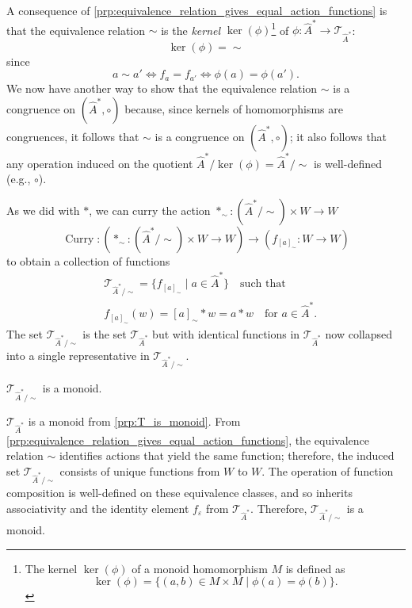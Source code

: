 A consequence of \cref{prp:equivalence_relation_gives_equal_action_functions} is that the equivalence relation $\sim$ is the \emph{kernel} $\operatorname{ker}(\phi)$\footnote{
The kernel $\operatorname{ker}(\phi)$ of a monoid homomorphism $M$ is defined as
\begin{equation}
    \operatorname{ker}(\phi) = \{(a,b) \in M \times M \mid \phi(a) = \phi(b) \}.
\end{equation}
} of $\phi: \hat{A}^{*} \to \mathcal{T}_{\hat{A}^{*}}$:
\begin{equation}
    \operatorname{ker}(\phi) = \sim
\end{equation}
since
\begin{equation}
    a \sim a' \iff f_{a} = f_{a'} \iff \phi(a) = \phi(a').
\end{equation}
We now have another way to show that the equivalence relation $\sim$ is a congruence on $(\hat{A}^{*}, \circ)$ because, since kernels of homomorphisms are congruences, it follows that $\sim$ is a congruence on $(\hat{A}^{*}, \circ)$; it also follows that any operation induced on the quotient $\hat{A}^{*}/\operatorname{ker}(\phi) = \hat{A}^{*}/\sim$ is well-defined (e.g., $\circ$).

As we did with $\ast$, we can curry the action $\ast_{\sim}: (\hat{A}^{*}/\sim) \times W \to W$
\begin{equation}
    \operatorname{Curry}: (\ast_{\sim}: (\hat{A}^{*}/\sim) \times W \to W) \to (f_{[a]_{\sim}}: W \to W)
\end{equation}
to obtain a collection of functions
\begin{equation}
\begin{aligned}
     & \mathcal{T}_{\hat{A}^{*}/\sim} = \{ f_{[a]_{\sim}} \mid a \in \hat{A}^{*} \} \quad \text{such that} \\
     & f_{[a]_{\sim}}(w) = [a]_{\sim} \ast w = a \ast w \quad \text{for $a \in \hat{A}^{*}$}.
\end{aligned}
\end{equation}
The set $\mathcal{T}_{\hat{A}^{*}/\sim}$ is the set $\mathcal{T}_{\hat{A}^{*}}$ but with identical functions in $\mathcal{T}_{\hat{A}^{*}}$ now collapsed into a single representative in $\mathcal{T}_{\hat{A}^{*}/\sim}$.

\begin{propositionE}
\label{prp:transformations_are_submonoid_of_full_transformation_monoid_on_W}
    $\mathcal{T}_{\hat{A}^{*}/\sim}$ is a monoid.
\end{propositionE}
\begin{proofE}
    $\mathcal{T}_{\hat{A}^{*}}$ is a monoid from \cref{prp:T_is_monoid}.
    From \cref{prp:equivalence_relation_gives_equal_action_functions}, the equivalence relation $\sim$ identifies actions that yield the same function; therefore, the induced set $\mathcal{T}_{\hat{A}^{*}/\sim}$ consists of unique functions from $W$ to $W$.
    The operation of function composition is well-defined on these equivalence classes, and so inherits associativity and the identity element $f_{\varepsilon}$ from $\mathcal{T}_{\hat{A}^{*}}$.
    Therefore, $\mathcal{T}_{\hat{A}^{*}/\sim}$ is a monoid.
\end{proofE}

